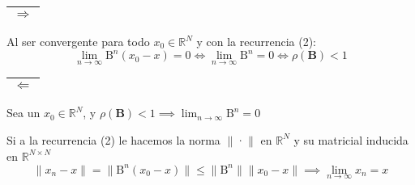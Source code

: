 \documentclass{article}
\begin{document}
\begin{tabular}{|c|}
\hline
$\Rightarrow$ \\
\hline	
\end{tabular}
Al ser convergente para todo $x_0\in\mathbb{R}^N$ y con la recurrencia (2):
$$\lim_{n\to\infty}\text{B}^n(x_0-x)=0\iff\lim_{n\to\infty}\text{B}^n=0\iff\rho(\textbf{B})<1$$

\begin{tabular}{|c|}
\hline
$\Leftarrow$ \\
\hline	
\end{tabular}
Sea un $x_0\in\mathbb{R}^N$, y $\rho(\textbf{B})<1\implies\lim_{n\to\infty}\text{B}^n=0$

Si a la recurrencia (2) le hacemos la norma $\|$·$\|$ en $\mathbb{R}^N$ y su matricial inducida en $\mathbb{R}^{N\times N}$
$$\|x_n-x\|=\|\text{B}^n(x_0-x)\|\leq\|\text{B}^n\|\|x_0-x\|\implies\lim_{n\to\infty}x_n=x$$
\end{document}
